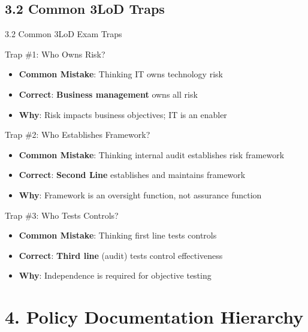 \documentclass[10pt]{beamer}  %
\begin{document}
	\subsection{3.2 Common 3LoD Traps}
	\begin{frame}{3.2 Common 3LoD Exam Traps}
		\begin{block}{Trap \#1: Who Owns Risk?}
			\begin{itemize}
				\item \textbf{Common Mistake}: Thinking IT owns technology risk
				\item \textbf{Correct}: \textbf{Business management} owns all risk
				\item \textbf{Why}: Risk impacts business objectives; IT is an enabler
			\end{itemize}
		\end{block}
		
		\begin{block}{Trap \#2: Who Establishes Framework?}
			\begin{itemize}
				\item \textbf{Common Mistake}: Thinking internal audit establishes risk framework
				\item \textbf{Correct}: \textbf{Second Line} establishes and maintains framework
				\item \textbf{Why}: Framework is an oversight function, not assurance function
			\end{itemize}
		\end{block}
		
		\begin{block}{Trap \#3: Who Tests Controls?}
			\begin{itemize}
				\item \textbf{Common Mistake}: Thinking first line tests controls
				\item \textbf{Correct}: \textbf{Third line} (audit) tests control effectiveness
				\item \textbf{Why}: Independence is required for objective testing
			\end{itemize}
		\end{block}
	\end{frame}
	
	\section{4. Policy Documentation Hierarchy}
	
\end{document}
